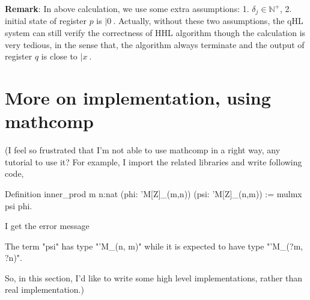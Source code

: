 \textbf{Remark}: In above calculation, we use some extra assumptions: 1. $\delta_j\in \mathbb{N}^+$, 2. initial state of register $p$ is $|0\>$. Actually, without these two assumptions, the qHL system can still verify the correctness of HHL algorithm though the calculation is very tedious, in the sense that, the algorithm always terminate and the output of register $q$ is close to $|x\>$.






\iffalse    
\section{More on implementation, using mathcomp}
    
    (I feel so frustrated that I'm not able to use mathcomp in a right way, any tutorial to use it? For example, I import the related libraries and write following code,
    \begin{coq}
      Definition inner_prod {m n:nat} (phi: 'M[Z]_(m,n)) (psi: 'M[Z]_(n,m)) :=  mulmx psi phi.
    \end{coq}
    I get the error message 
    \begin{coq}
      The term "psi" has type "'M_(n, m)" while it is expected to have type "'M_(?m, ?n)".
    \end{coq}
    So, in this section, I'd like to write some high level implementations, rather than real implementation.)
    
